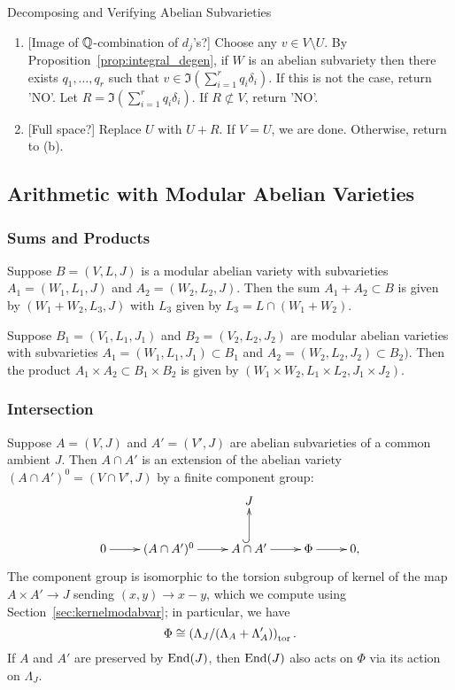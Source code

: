 \documentclass{article}
\begin{document}
\begin{algorithm}{Decomposing and Verifying Abelian Subvarieties}
\begin{enumerate}
            \begin{enumerate}
                \item{} [Image of $\mathbb{Q}$-combination of $d_j$'s?]
                    Choose any $v\in V\setminus U$. By
                    Proposition~\ref{prop:integral_degen}, if $W$ is an abelian
                    subvariety then there exists $q_1,\ldots,q_r$
                    such that $v\in \Im \left(\sum_{i=1} ^r q_i
                    \delta_i\right)$. If this is not the case, return
                    'NO'. Let $R = \Im \left(\sum_{i=1} ^r q_i
                    \delta_i\right)$. If $R\not\subset V$, return 'NO'.  
                \item{} [Full space?]
                    Replace $U$ with $U+R$. If $V=U$, we are done. Otherwise,
                    return to (b). 
            \end{enumerate}
    \end{enumerate}
\end{algorithm}


\subsection{Arithmetic with Modular Abelian Varieties}

\subsubsection{Sums and Products}

Suppose $B=(V, L, J)$ is a modular abelian variety with subvarieties $A_1=(W_1,
L_1, J)$ and $A_2=(W_2, L_2, J)$. Then the sum $A_1+A_2\subset B$ is given by
$(W_1+W_2, L_3, J)$ with $L_3$ given by $L_3 = L\cap (W_1+W_2)$.

Suppose $B_1=(V_1, L_1, J_1)$ and $B_2=(V_2, L_2, J_2)$ are modular abelian
varieties with subvarieties $A_1=(W_1, L_1, J_1)\subset B_1$ and $A_2=(W_2,
L_2, J_2)\subset B_2)$. Then the product $A_1\times A_2\subset B_1\times
B_2$ is given by $(W_1\times W_2, L_1\times L_2, J_1\times J_2)$.

\subsubsection{Intersection}


Suppose $A = (V,J)$ and $A' = (V', J)$ are abelian subvarieties of a
common ambient $J$.  Then $A\cap A'$ is an extension of the abelian
variety $(A\cap A')^0 = (V\cap V', J)$ by a finite component group:
$$
\xymatrix{
   & & J & & \\
   0\ar[r]& (A\cap A')^0 \ar[r]&  A\cap A'\ar@{^(->}[u] \ar[r]& \Phi\ar[r] & 0,
}
$$
The component group is isomorphic to the torsion subgroup of kernel of
the map $A \times A' \to J$ sending $(x,y)\to x-y$, which we compute
using Section~\ref{sec:kernelmodabvar}; in particular, we have
$$
   \Phi \cong \left( \Lambda_J/(\Lambda_A + \Lambda_A')\right)_{\operatorname{tor}}.
$$
If $A$ and $A'$ are preserved by $\operatorname{End}(J)$, then $\operatorname{End}(J)$ also
acts on $\Phi$ via its action on $\Lambda_J$.
\end{document}
